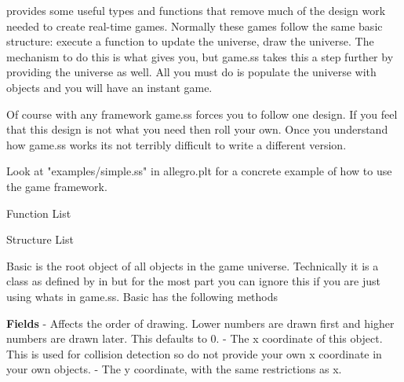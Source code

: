 \newcommand{\syntax}[1]{syntax: \scheme{#1}}


 provides some useful types and functions that remove much of the design work needed to create real-time games. Normally these games follow the same basic structure: execute a function to update the universe, draw the universe. The mechanism to do this is what  gives you, but game.ss takes this a step further by providing the universe as well. All you must do is populate the universe with objects and you will have an instant game.

Of course with any framework game.ss forces you to follow one design. If you feel that this design is not what you need then roll your own. Once you understand how game.ss works its not terribly difficult to write a different version.

Look at "examples/simple.ss" in allegro.plt for a concrete example of how to use the game framework.

Function List


Structure List



Basic is the root object of all objects in the game universe. Technically it is a class as defined by  in  but for the most part you can ignore this if you are just using whats in game.ss. Basic has the following methods

{\bf Fields}\newline
{} - Affects the order of drawing. Lower numbers are drawn first and higher numbers are drawn later. This defaults to 0.\newline
{} - The x coordinate of this object. This is used for collision detection so do not provide your own x coordinate in your own objects.\newline
{} - The y coordinate, with the same restrictions as x.\newline

